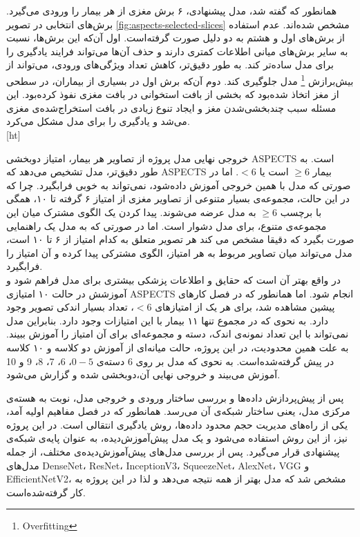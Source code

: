 همانطور که گفته شد، مدل پیشنهادی، ۶ برش مغزی از هر بیمار را ورودی می‌گیرد.
 برش‌های انتخابی در تصویر \ref{fig:aspects-selected-slices} مشخص شده‌اند.
 عدم استفاده از برش‌های اول و هشتم 
به دو دلیل صورت گرفته‌است.
اول آن‌که این برش‌ها، نسبت به سایر برش‌های میانی اطلاعات کمتری دارند و حذف آن‌ها می‌تواند فرایند یادگیری را برای مدل ساده‌تر کند.
به طور دقیق‌تر، کاهش تعداد ویژگی‌های ورودی، می‌تواند از بیش‌برازش
\footnote{Overfitting}
مدل جلوگیری کند.
دوم آن‌که برش اول در بسیاری از بیماران، در سطحی از مغز اتخاذ شده‌بود که 
بخشی از بافت استخوانی در بافت مغزی نفوذ کرده‌بود.
این مسئله سبب چند‌بخشی‌شدن مغز و ایجاد تنوع زیادی در بافت استخراج‌شده‌ی مغزی می‌شد و یادگیری را برای مدل مشکل می‌کرد.\\

[ht]


خروجی نهایی مدل پروژه از تصاویر هر بیمار، امتیاز دوبخشی ASPECTS است.
به طور دقیق‌تر، مدل تشخیص می‌دهد که ASPECTS بیمار $\geq 6$ است یا $<6$.
اما در صورتی که مدل با همین خروجی آموزش داده‌شود،
نمی‌تواند به خوبی فرابگیرد.
چرا که در این حالت،
مجموعه‌ی بسیار متنوعی از تصاویر مغزی از
امتیاز ۶ گرفته تا ۱۰، همگی با برچسب
$\geq6$ به مدل عرضه می‌شوند.
پیدا کردن یک الگوی مشترک میان این مجموعه‌ی متنوع، برای مدل دشوار است.
اما در صورتی که به مدل یک راهنمایی صورت بگیرد که دقیقا مشخص می کند هر تصویر متعلق به کدام امتیاز از ۶ تا ۱۰ است، مدل می‌تواند میان تصاویر مربوط به هر امتیاز، الگوی مشترکی پیدا کرده و آن امتیاز را فرابگیرد.\\

در واقع بهتر آن است که حقایق و اطلاعات پزشکی بیشتری برای مدل فراهم شود و آموزشش در حالت ۱۰ امتیازی ASPECTS انجام شود.
اما همانطور که در فصل کار‌های پیشین مشاهده شد، برای هر یک از امتیاز‌های $<6$، تعداد بسیار اندکی تصویر وجود دارد.
به نحوی که در مجموع تنها ۱۱ بیمار با این امتیازات وجود دارد.
بنابراین مدل نمی‌تواند با این تعداد نمونه‌ی اندک، دسته و مجموعه‌ای برای آن امتیاز را آموزش ببیند.
به علت همین محدودیت، در این پروژه، حالت میانه‌ای از آموزش دو کلاسه و ۱۰ کلاسه در پیش گرفته‌شده‌است.
به نحوی که مدل بر روی 6 دسته‌ی $0-5$، 6، 7، 8، 9 و 10 آموزش می‌بیند و خروجی نهایی آن،‌دوبخشی شده و گزارش می‌شود.


پس از پیش‌پردازش داده‌ها و بررسی ساختار ورودی و خروجی مدل، نوبت به هسته‌ی مرکزی مدل، یعنی ساختار شبکه‌ی آن می‌رسد.
همانطور که در فصل مفاهیم اولیه آمد، یکی از راه‌های مدیریت حجم محدود داده‌ها، روش یادگیری انتقالی است.
در این پروژه نیز، از این روش استفاده می‌شود و یک مدل پیش‌آموزش‌دیده، به عنوان پایه‌ی شبکه‌ی پیشنهادی قرار می‌گیرد.
پس از بررسی مدل‌های پیش‌آموزش‌دیده‌ی مختلف، از جمله مدل‌های DenseNet، ResNet، InceptionV3، SqueezeNet، AlexNet، VGG و EfficientNetV2، مشخص شد که مدل  بهتر از همه نتیجه می‌دهد و لذا 
در این پروژه به کار گرفته‌شده‌است.\\

